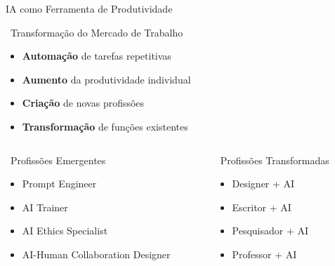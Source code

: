 \documentclass[aspectratio=169,12pt]{beamer}
\begin{document}
\begin{frame}{IA como Ferramenta de Produtividade}
    \begin{block}{\faRocket\, Transformação do Mercado de Trabalho}
        \begin{itemize}
            \item \textbf{Automação} de tarefas repetitivas
            \item \textbf{Aumento} da produtividade individual
            \item \textbf{Criação} de novas profissões
            \item \textbf{Transformação} de funções existentes
        \end{itemize}
    \end{block}
    
    \begin{columns}
        \begin{column}{0.5\textwidth}
            \begin{exampleblock}{\faPlus\, Profissões Emergentes}
                \begin{itemize}
                    \item Prompt Engineer
                    \item AI Trainer
                    \item AI Ethics Specialist
                    \item AI-Human Collaboration Designer
                \end{itemize}
            \end{exampleblock}
        \end{column}
        \begin{column}{0.5\textwidth}
            \begin{block}{\faSync\, Profissões Transformadas}
                \begin{itemize}
                    \item Designer + AI
                    \item Escritor + AI
                    \item Pesquisador + AI
                    \item Professor + AI
                \end{itemize}
            \end{block}
        \end{column}
    \end{columns}
\end{frame}
\end{document}
